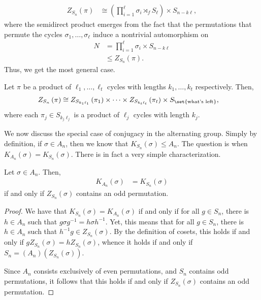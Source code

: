 \documentclass[10pt]{mypackage}
\begin{document}
\begin{align*}
  Z_{S_n}\left( \pi \right) &\cong \left( \prod_{i=1}^{\ell}\sigma_i\rtimes_{f} S_{\ell} \right)\times S_{n-k\ell},
\end{align*}
where the semidirect product emerges from the fact that the permutations that permute the cycles $\sigma_1,\dots,\sigma_{\ell}$ induce a nontrivial automorphism on 
\begin{align*}
  N &= \prod_{i=1}^{\ell}\sigma_i\times S_{n-k\ell}\\
    &\leq Z_{S_n}\left( \pi \right).
\end{align*}
Thus, we get the most general case.
\begin{theorem}
  Let $\pi$ be a product of $\ell_1,\dots,\ell_t$ cycles with lengths $k_1,\dots,k_t$ respectively. Then,
  \begin{align*}
    Z_{S_n}\left( \pi \right) &\cong Z_{S_{k_1\ell_1}}\left( \pi_1 \right)\times\cdots\times Z_{S_{k_t\ell_t}}\left( \pi_t \right)\times S_{\set{\text{what's left}}},
  \end{align*}
  where each $\pi_j\in S_{k_j\ell_j}$ is a product of $\ell_j$ cycles with length $k_j$.
\end{theorem}
We now discuss the special case of conjugacy in the alternating group. Simply by definition, if $\sigma\in A_n$, then we know that $K_{S_n}\left( \sigma \right)\leq A_n$. The question is when $K_{A_n}\left(\sigma\right) = K_{S_n}\left(\sigma\right)$. There is in fact a very simple characterization.
\begin{lemma}
  Let $\sigma\in A_n$. Then,
  \begin{align*}
    K_{A_n}\left( \sigma \right) &= K_{S_n}\left( \sigma \right)
  \end{align*}
  if and only if $Z_{S_n}\left( \sigma \right)$ contains an odd permutation.
\end{lemma}
\begin{proof}
  We have that $K_{S_n}\left( \sigma \right) = K_{A_n}\left( \sigma \right)$ if and only if for all $g\in S_n$, there is $h\in A_n$ such that $g\sigma g^{-1} = h\sigma h^{-1}$. Yet, this means that for all $g\in S_n$, there is $h\in A_n$ such that $h^{-1}g\in Z_{S_n}\left( \sigma \right)$. By the definition of cosets, this holds if and only if $gZ_{S_n}\left( \sigma \right) = hZ_{S_n}\left( \sigma \right)$, whence it holds if and only if $S_n = \left( A_n \right)\left( Z_{S_n}\left( \sigma \right) \right)$.%

  Since $A_n$ consists exclusively of even permutations, and $S_n$ contains odd permutations, it follows that this holds if and only if $Z_{S_n}\left( \sigma \right)$ contains an odd permutation.
\end{proof}
\end{document}
